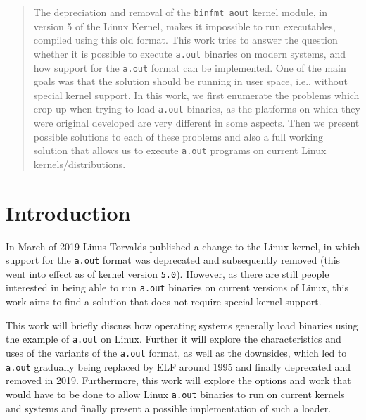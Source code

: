 \documentclass[draft,final]{vutinfth} %
\begin{document}
\begin{abstract}
The depreciation and removal of the \texttt{binfmt\_aout} kernel module, in version 5 of the Linux Kernel, makes it impossible to run executables, compiled using this old format. This work tries to answer the question whether it is possible to execute \texttt{a.out} binaries on modern systems, and how support for the \texttt{a.out} format can be implemented. One of the main goals was that the solution should be running in user space, i.e., without special kernel support. In this work, we first enumerate the problems which crop up when trying to load \texttt{a.out} binaries, as the platforms on which they were original developed are very different in some aspects. Then we present possible solutions to each of these problems and also a full working solution that allows us to execute \texttt{a.out} programs on current Linux kernels/distributions.
\end{abstract}


\tableofcontents %

\mainmatter

\chapter{Introduction}
\label{intro}

In March of 2019 Linus Torvalds published a change \cite{PhoronixNews} \cite{LinuxKernelGitMsg} to the Linux kernel, in which support for the \texttt{a.out} format was deprecated and subsequently removed (this went into effect as of kernel version \texttt{5.0}). However, as there are still people interested in being able to run \texttt{a.out} binaries on current versions of Linux, this work aims to find a solution that does not require special kernel support.

This work will briefly discuss how operating systems generally load binaries using the example of \texttt{a.out} on Linux. Further it will explore the characteristics and uses of the variants of the \texttt{a.out} format, as well as the downsides, which led to \texttt{a.out} gradually being replaced by ELF around 1995 and finally deprecated and removed in 2019. Furthermore, this work will explore the options and work that would have to be done to allow Linux \texttt{a.out} binaries to run on current kernels and systems and finally present a possible implementation of such a loader.
\end{document}
